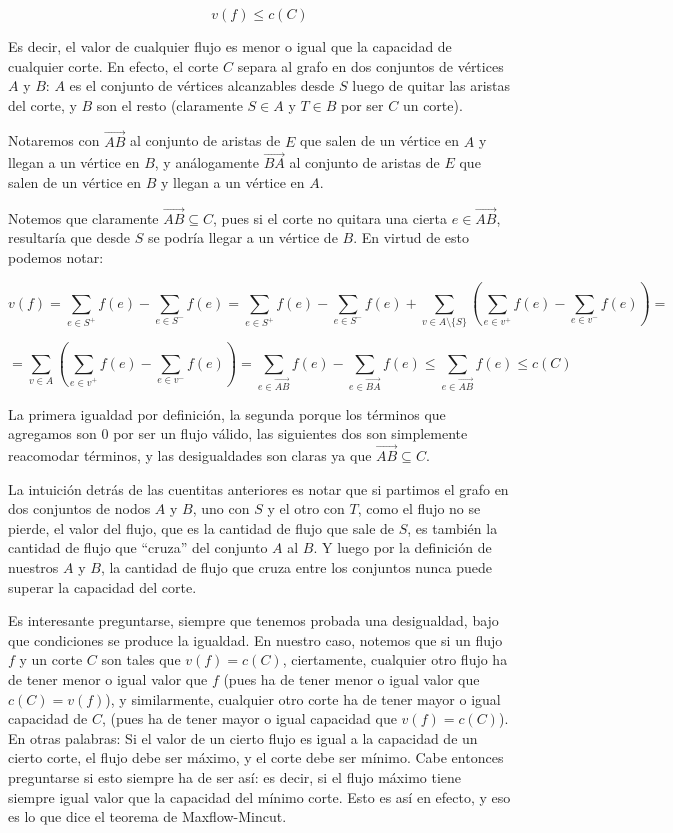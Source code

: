 \documentclass{article}
\begin{document}
$$v(f) \leq c(C)$$

Es decir, el valor de cualquier flujo es menor o igual que la capacidad de cualquier corte. En efecto,
el corte $C$ separa al grafo en dos conjuntos de vértices $A$ y $B$: $A$ es el conjunto de vértices alcanzables desde $S$
luego de quitar las aristas del corte, y $B$ son el resto (claramente $S \in A$ y $T \in B$ por ser $C$ un corte).

Notaremos con $\overrightarrow{AB}$ al conjunto de aristas de $E$ que salen de un vértice en $A$ y llegan a un vértice en $B$,
y análogamente $\overrightarrow{BA}$ al conjunto de aristas de $E$ que salen de un vértice en $B$ y llegan a un vértice en $A$.

Notemos que claramente $\overrightarrow{AB} \subseteq C$, pues si el corte no quitara una cierta $e \in \overrightarrow{AB}$,
resultaría que desde $S$ se podría llegar a un vértice de $B$. En virtud de esto podemos notar:

$$v(f) = \sum_{e \in S^+}{f(e)} - \sum_{e \in S^-}{f(e)} = \sum_{e \in S^+}{f(e)} - \sum_{e \in S^-}{f(e)} + 
\sum_{v \in A \setminus \{S\}}{\left (\sum_{e \in v^+}{f(e)} - \sum_{e \in v^-}{f(e)}\right )} =$$

$$= \sum_{v \in A }{\left (\sum_{e \in v^+}{f(e)} - \sum_{e \in v^-}{f(e)}\right )} = 
\sum_{e \in \overrightarrow{AB}}{f(e)} - \sum_{e \in \overrightarrow{BA}}{f(e)} \leq
\sum_{e \in \overrightarrow{AB}}{f(e)} \leq c(C)$$

La primera igualdad por definición, la segunda porque los términos que agregamos son 0 por ser un flujo válido, las siguientes dos
son simplemente reacomodar términos, y las desigualdades son claras ya que $\overrightarrow{AB} \subseteq C$.

La intuición detrás de las cuentitas anteriores es notar que si partimos el grafo en dos conjuntos de nodos $A$ y $B$, uno con $S$ y el otro con $T$,
como el flujo no se pierde, el valor del flujo, que es la cantidad de flujo que sale de $S$, es también la cantidad de flujo que ``cruza''
del conjunto $A$ al $B$. Y luego por la definición de nuestros $A$ y $B$, la cantidad de flujo que cruza entre los conjuntos nunca puede
superar la capacidad del corte.

Es interesante preguntarse, siempre que tenemos probada una desigualdad, bajo que condiciones se produce la igualdad. En nuestro caso,
notemos que si un flujo $f$ y un corte $C$ son tales que $v(f) = c(C)$, ciertamente, cualquier otro flujo ha de tener menor o igual valor que $f$
(pues ha de tener menor o igual valor que $c(C) = v(f)$), y similarmente, cualquier otro corte ha de tener mayor o igual capacidad de $C$,
(pues ha de tener mayor o igual capacidad que $v(f) = c(C)$). En otras palabras: Si el valor de un cierto flujo es igual a la capacidad
de un cierto corte, el flujo debe ser máximo, y el corte debe ser mínimo. Cabe entonces preguntarse si esto siempre ha de ser así: es decir,
si el flujo máximo tiene siempre igual valor que la capacidad del mínimo corte. Esto es así en efecto, y eso es lo que dice el teorema de
Maxflow-Mincut.
\end{document}
